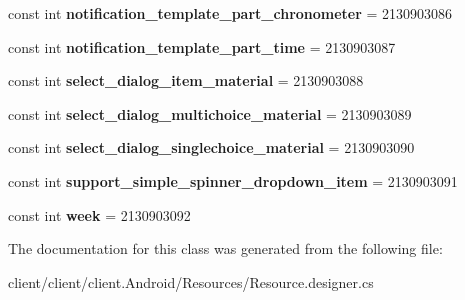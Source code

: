 \begin{DoxyCompactItemize}
\item 
\hypertarget{classClient_1_1Droid_1_1Resource_1_1Layout_a040d66c5851fff2f9f73c53fe279aca8}{}const int {\bfseries notification\+\_\+template\+\_\+part\+\_\+chronometer} = 2130903086\label{classClient_1_1Droid_1_1Resource_1_1Layout_a040d66c5851fff2f9f73c53fe279aca8}

\item 
\hypertarget{classClient_1_1Droid_1_1Resource_1_1Layout_a190ef0ef7080f3d26e63f68f2b9b4895}{}const int {\bfseries notification\+\_\+template\+\_\+part\+\_\+time} = 2130903087\label{classClient_1_1Droid_1_1Resource_1_1Layout_a190ef0ef7080f3d26e63f68f2b9b4895}

\item 
\hypertarget{classClient_1_1Droid_1_1Resource_1_1Layout_a284c7d6605c67ce5b6d6d3c23efd5441}{}const int {\bfseries select\+\_\+dialog\+\_\+item\+\_\+material} = 2130903088\label{classClient_1_1Droid_1_1Resource_1_1Layout_a284c7d6605c67ce5b6d6d3c23efd5441}

\item 
\hypertarget{classClient_1_1Droid_1_1Resource_1_1Layout_a50b4dc2f669fb8a78d26ff9cc5de3863}{}const int {\bfseries select\+\_\+dialog\+\_\+multichoice\+\_\+material} = 2130903089\label{classClient_1_1Droid_1_1Resource_1_1Layout_a50b4dc2f669fb8a78d26ff9cc5de3863}

\item 
\hypertarget{classClient_1_1Droid_1_1Resource_1_1Layout_a70e9fd657843ab4c9395de0a99735e76}{}const int {\bfseries select\+\_\+dialog\+\_\+singlechoice\+\_\+material} = 2130903090\label{classClient_1_1Droid_1_1Resource_1_1Layout_a70e9fd657843ab4c9395de0a99735e76}

\item 
\hypertarget{classClient_1_1Droid_1_1Resource_1_1Layout_afd1ffb63b6d260323ec7e369d0edf6c3}{}const int {\bfseries support\+\_\+simple\+\_\+spinner\+\_\+dropdown\+\_\+item} = 2130903091\label{classClient_1_1Droid_1_1Resource_1_1Layout_afd1ffb63b6d260323ec7e369d0edf6c3}

\item 
\hypertarget{classClient_1_1Droid_1_1Resource_1_1Layout_a4be0ec3fe7d50dbd7e003329711c94c0}{}const int {\bfseries week} = 2130903092\label{classClient_1_1Droid_1_1Resource_1_1Layout_a4be0ec3fe7d50dbd7e003329711c94c0}

\end{DoxyCompactItemize}


The documentation for this class was generated from the following file\+:\begin{DoxyCompactItemize}
\item 
client/client/client.\+Android/\+Resources/Resource.\+designer.\+cs\end{DoxyCompactItemize}
